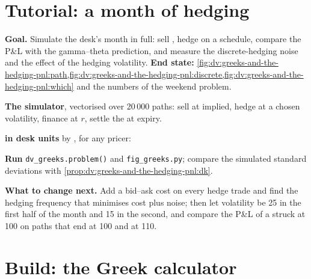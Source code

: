 \section{Tutorial: a month of hedging}\label{tut:dv:greeks-and-the-hedging-pnl:tut}

\begin{tutorial}
\textbf{Goal.} Simulate the desk's month in full: sell , hedge on a
schedule, compare the P\&L with the gamma--theta prediction, and measure the
discrete-hedging noise and the effect of the hedging volatility. \textbf{End state:}
\cref{fig:dv:greeks-and-the-hedging-pnl:path,fig:dv:greeks-and-the-hedging-pnl:discrete,fig:dv:greeks-and-the-hedging-pnl:which}
and the numbers of the weekend problem.
\begin{tutsteps}
\item \textbf{The simulator}, vectorised over 20\,000 paths: sell at implied, hedge
at a chosen volatility, finance at $r$, settle the  at expiry.
\label{lst:dv:greeks-and-the-hedging-pnl:sim}
\item \textbf{ in desk units} by , for any pricer:
\label{lst:dv:greeks-and-the-hedging-pnl:bump}
\item \textbf{Run} \texttt{dv\_greeks.problem()} and \texttt{fig\_greeks.py}; compare
the simulated standard deviations with \cref{prop:dv:greeks-and-the-hedging-pnl:dk}.
\end{tutsteps}
\textbf{What to change next.} Add a bid--ask cost on every hedge trade and find the
hedging frequency that minimises cost plus noise; then let volatility be 25 in the
first half of the month and 15 in the second, and compare the P\&L of a 
struck at 100 on paths that end at 100 and at 110.
\end{tutorial}

\section{Build: the Greek calculator}\label{bld:dv:greeks-and-the-hedging-pnl:greeks}

